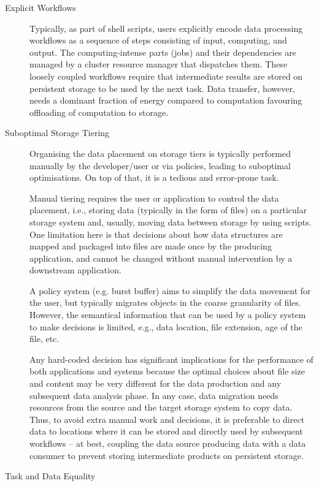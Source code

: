 \documentclass[a4paper]{article}
\begin{document}
{{\begin{description}
\item[Explicit Workflows]

Typically, as part of shell scripts, users explicitly encode data processing workflows as a sequence of steps consisting of input, computing, and output.
The computing-intense parts (jobs) and their dependencies are managed by a cluster resource manager that dispatches them.
These loosely coupled workflows require that intermediate results are stored on persistent storage to be used by the next task.
Data transfer, however, needs a dominant fraction of energy compared to computation favouring offloading of computation to storage.

\item[Suboptimal Storage Tiering]

Organising the data placement on storage tiers is typically performed manually by the developer/user or via policies, leading to suboptimal optimisations. On top of that, it is a tedious and error-prone task.

Manual tiering requires the user or application to control the data placement, i.e., storing data (typically in the form of files) on a particular storage system and, usually, moving data between storage by using scripts.
One limitation here is that decisions about how data structures are mapped and packaged into files are made once by the producing application, and cannot be changed without manual intervention by a downstream application.

A policy system (e.g. burst buffer) aims to simplify the data movement for the user, but typically migrates objects in the coarse granularity of files.
However, the semantical information that can be used by a policy system to make decisions is limited, e.g., data location, file extension, age of the file, etc.

Any hard-coded decision has significant implications for the performance of both applications and systems because the optimal choices about file size and content may be very different for the data production and any subsequent data analysis phase.
In any case, data migration needs resources from the source and the target storage system to copy data.
Thus, to avoid extra manual work and decisions, it is preferable to direct data to locations where it can be stored and directly used by subsequent workflows -- at best, coupling the data source producing data with a data consumer to prevent storing intermediate products on persistent storage.

\item[Task and Data Equality]


\end{description}}}
\end{document}
